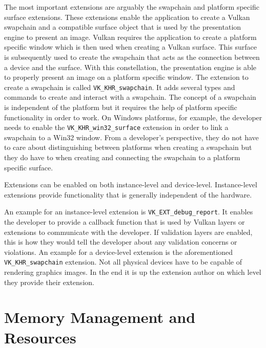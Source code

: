     The most important extensions are arguably the swapchain and platform specific surface extensions. These extensions enable the application to create a Vulkan swapchain and a compatible surface object that is used by the presentation engine to present an image. Vulkan requires the application to create a platform specific window which is then used when creating a Vulkan surface. This surface is subsequently used to create the swapchain that acts as the connection between a device and the surface. With this constellation, the presentation engine is able to properly present an image on a platform specific window. The extension to create a swapchain is called \lstinline{VK_KHR_swapchain}. It adds several types and commands to create and interact with a swapchain. The concept of a swapchain is independent of the platform but it requires the help of platform specific functionality in order to work. On Windows platforms, for example, the developer needs to enable the \lstinline{VK_KHR_win32_surface} extension in order to link a swapchain to a Win32 window. From a developer's perspective, they do not have to care about distinguishing between platforms when creating a swapchain but they do have to when creating and connecting the swapchain to a platform specific surface.

    Extensions can be enabled on both instance-level and device-level. Instance-level extensions provide functionality that is generally independent of the hardware.

    An example for an instance-level extension is \lstinline{VK_EXT_debug_report}. It enables the developer to provide a callback function that is used by Vulkan layers or extensions to communicate with the developer. If validation layers are enabled, this is how they would tell the developer about any validation concerns or violations. An example for a device-level extension is the aforementioned \lstinline{VK_KHR_swapchain} extension. Not all physical devices have to be capable of rendering graphics images. In the end it is up the extension author on which level they provide their extension.

  \section{Memory Management and Resources}
  \label{sec:MemoryManagement}

